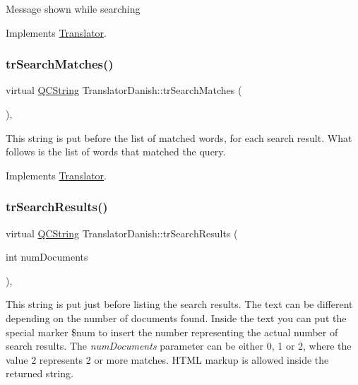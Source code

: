 Message shown while searching 

Implements \mbox{\hyperlink{class_translator}{Translator}}.

\mbox{\label{class_translator_danish_a07d7b2ce5706c959b8efbd1fba192472}} 
\subsubsection{\texorpdfstring{trSearchMatches()}{trSearchMatches()}}
{\footnotesize\ttfamily virtual \mbox{\hyperlink{class_q_c_string}{Q\+C\+String}} Translator\+Danish\+::tr\+Search\+Matches (\begin{DoxyParamCaption}{ }\end{DoxyParamCaption})\hspace{0.3cm}{\ttfamily [inline]}, {\ttfamily [virtual]}}

This string is put before the list of matched words, for each search result. What follows is the list of words that matched the query. 

Implements \mbox{\hyperlink{class_translator}{Translator}}.

\mbox{\label{class_translator_danish_a56db4f7240e3db3c645fe66c3f01fba5}} 
\subsubsection{\texorpdfstring{trSearchResults()}{trSearchResults()}}
{\footnotesize\ttfamily virtual \mbox{\hyperlink{class_q_c_string}{Q\+C\+String}} Translator\+Danish\+::tr\+Search\+Results (\begin{DoxyParamCaption}\item[{int}]{num\+Documents }\end{DoxyParamCaption})\hspace{0.3cm}{\ttfamily [inline]}, {\ttfamily [virtual]}}

This string is put just before listing the search results. The text can be different depending on the number of documents found. Inside the text you can put the special marker \$num to insert the number representing the actual number of search results. The {\itshape num\+Documents} parameter can be either 0, 1 or 2, where the value 2 represents 2 or more matches. H\+T\+ML markup is allowed inside the returned string. 

